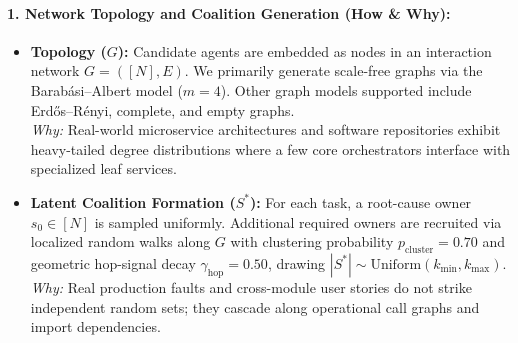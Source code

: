 \documentclass{article}
\theoremstyle{definition}
\begin{document}
\paragraph{1. Network Topology and Coalition Generation (How \& Why):}
\begin{itemize}
    \item \textbf{Topology ($G$):} Candidate agents are embedded as nodes in an interaction network $G = ([N], E)$. We primarily generate scale-free graphs via the Barab{\'a}si--Albert model ($m=4$). Other graph models supported include Erd\H{o}s--R\'{e}nyi, complete, and empty graphs. \\
    \emph{Why:} Real-world microservice architectures and software repositories exhibit heavy-tailed degree distributions where a few core orchestrators interface with specialized leaf services.
    \item \textbf{Latent Coalition Formation ($S^*$):} For each task, a root-cause owner $s_0 \in [N]$ is sampled uniformly. Additional required owners are recruited via localized random walks along $G$ with clustering probability $p_{\mathrm{cluster}} = 0.70$ and geometric hop-signal decay $\gamma_{\mathrm{hop}} = 0.50$, drawing $|S^*| \sim \mathrm{Uniform}(k_{\min}, k_{\max})$. \\
    \emph{Why:} Real production faults and cross-module user stories do not strike independent random sets; they cascade along operational call graphs and import dependencies.
\end{itemize}
\end{document}
